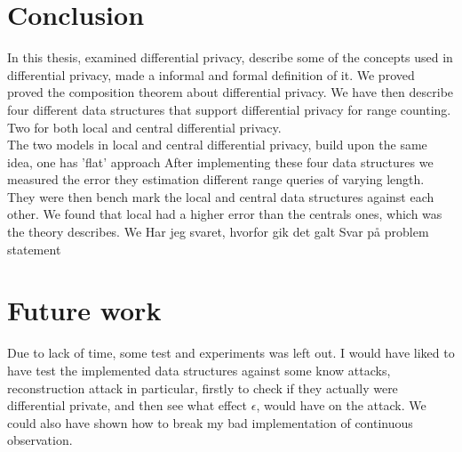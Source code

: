 \documentclass[11pt]{article}
\theoremstyle{definition}
\begin{document}
\section{Conclusion}
In this thesis, examined differential privacy, describe some of the concepts used in differential privacy, made a informal and formal definition of it. We proved proved the composition theorem about differential privacy. We have then describe four different data structures that support differential privacy for range counting. Two for both local and central differential privacy. \\
The two models in local and central differential privacy, build upon the same idea, one has 'flat' approach 
After implementing these four data structures we measured the error they estimation different range queries of varying length. They were then bench mark the local and central data structures against each other. We found that local had a higher error than the centrals ones, which was the theory describes.
We 
Har jeg svaret, hvorfor gik det galt
Svar på problem statement
\section{Future work}
Due to lack of time, some test and experiments was left out. I would have liked to have test the implemented data structures against some know attacks, reconstruction attack in particular, firstly to check if they actually were differential private, and then see what effect $\epsilon$, would have on the attack. We could also have shown how to break my bad implementation of continuous observation.
\end{document}
